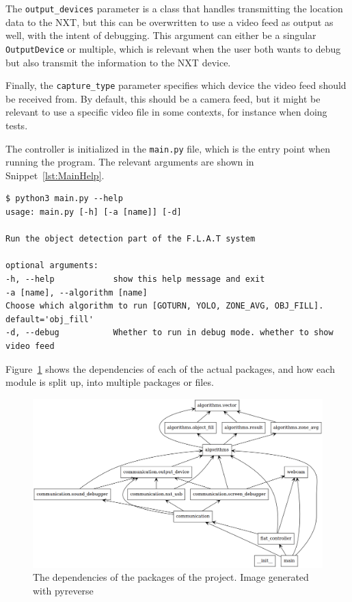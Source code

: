 The \texttt{output\_devices} parameter is a class that handles transmitting the location data to the NXT, but this can be overwritten to use a video feed as output as well, with the intent of debugging. 
This argument can either be a singular \texttt{OutputDevice} or multiple, which is relevant when the user both wants to debug but also transmit the information to the NXT device.


Finally, the \texttt{capture\_type} parameter specifies which device the video feed should be received from.
By default, this should be a camera feed, but it might be relevant to use a specific video file in some contexts, for instance when doing tests.


The controller is initialized in the \texttt{main.py} file, which is the entry point when running the program. The relevant arguments are shown in Snippet~\ref{lst:MainHelp}.
\begin{lstlisting}[label={lst:MainHelp},caption={The help message of the commandline interface}]
$ python3 main.py --help
usage: main.py [-h] [-a [name]] [-d]

Run the object detection part of the F.L.A.T system

optional arguments:
-h, --help            show this help message and exit
-a [name], --algorithm [name]
Choose which algorithm to run [GOTURN, YOLO, ZONE_AVG, OBJ_FILL]. default='obj_fill'
-d, --debug           Whether to run in debug mode. whether to show video feed
\end{lstlisting}
Figure~\ref{fig:pythonClasses} shows the dependencies of each of the actual packages, and how each module is split up, into multiple packages or files.

\begin{figure}[H]
	\centering
	\includegraphics[width=\textwidth]{5.Solution/images/python_packages.png}
	\caption{The dependencies of the packages of the project{.} Image generated with pyreverse\cite{pyreverse}}
	\label{fig:pythonClasses}
\end{figure}


